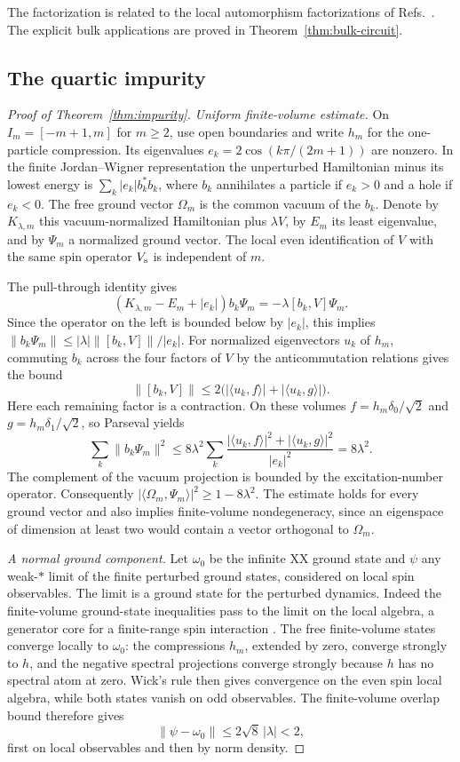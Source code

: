 The factorization is related to the local automorphism factorizations of Refs.~\cite{NO,Ogata}. The explicit bulk applications are proved in Theorem~\ref{thm:bulk-circuit}.

\subsection{The quartic impurity}
\begin{proof}[Proof of Theorem~\ref{thm:impurity}]
\emph{Uniform finite-volume estimate.}
On $I_m=[-m+1,m]$ for $m\geq2$, use open boundaries and write $h_m$ for the
one-particle compression. Its eigenvalues $e_k=2\cos(k\pi/(2m+1))$ are nonzero.
In the finite Jordan--Wigner representation the unperturbed Hamiltonian
minus its lowest energy is $\sum_k |e_k| b_k^*b_k$, where $b_k$ annihilates a
particle if $e_k>0$ and a hole if $e_k<0$. The free ground vector $\Omega_m$ is
the common vacuum of the $b_k$. Denote by $K_{\lambda,m}$ this vacuum-normalized
Hamiltonian plus $\lambda V$, by $E_m$ its least eigenvalue, and by $\Psi_m$
a normalized ground vector. The local even identification of $V$ with the
same spin operator $V_{\rm s}$ is independent of $m$.

The pull-through identity gives
\[
 (K_{\lambda,m}-E_m+|e_k|)b_k\Psi_m=-\lambda[b_k,V]\Psi_m.
\]
Since the operator on the left is bounded below by $|e_k|$, this implies
$\|b_k\Psi_m\|\leq |\lambda|\|[b_k,V]\|/|e_k|$. For normalized eigenvectors
$u_k$ of $h_m$, commuting $b_k$ across the four factors of $V$ by the
anticommutation relations gives the bound
\[
 \|[b_k,V]\|\leq 2\bigl(|\langle u_k,f\rangle|+|\langle u_k,g\rangle|\bigr).
\]
Here each remaining factor is a contraction. On these volumes
$f=h_m\delta_0/\sqrt2$ and $g=h_m\delta_1/\sqrt2$, so Parseval yields
\[
 \sum_k\|b_k\Psi_m\|^2
 \leq 8\lambda^2\sum_k
 \frac{|\langle u_k,f\rangle|^2+|\langle u_k,g\rangle|^2}{|e_k|^2}
 =8\lambda^2.
\]
The complement of the vacuum projection is bounded by the excitation-number
operator. Consequently
$|\langle\Omega_m,\Psi_m\rangle|^2\geq1-8\lambda^2$. The estimate holds for
every ground vector and also implies finite-volume nondegeneracy, since an
eigenspace of dimension at least two would contain a vector orthogonal to
$\Omega_m$.

\emph{A normal ground component.}
Let $\omega_0$ be the infinite XX ground state and $\psi$ any weak-$*$ limit of
the finite perturbed ground states, considered on local spin observables.
The limit is a ground state for the perturbed dynamics. Indeed the
finite-volume ground-state inequalities pass to the limit on the local
algebra, a generator core for a finite-range spin interaction \cite{BR2}.
The free finite-volume states converge locally to $\omega_0$: the compressions
$h_m$, extended by zero, converge strongly to $h$, and the negative spectral
projections converge strongly because $h$ has no spectral atom at zero.
Wick's rule then gives convergence on the even spin local algebra, while
both states vanish on odd observables. The finite-volume overlap bound
therefore gives
\[
 \|\psi-\omega_0\|\leq 2\sqrt8\,|\lambda|<2,
\]
first on local observables and then by norm density.


\end{proof}
